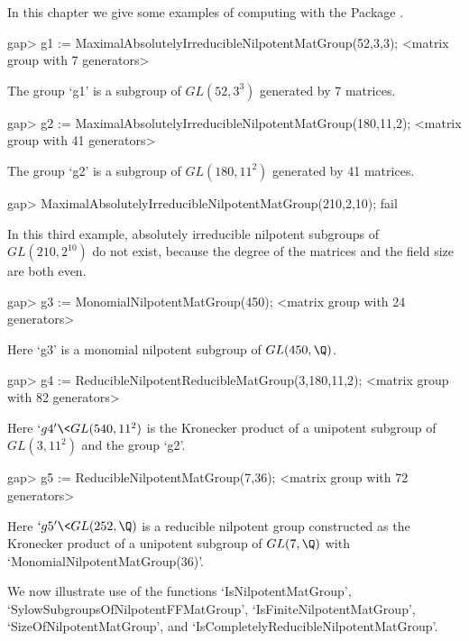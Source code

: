 

In this chapter we give some examples of computing with the Package
.


\beginexample
gap> g1 := MaximalAbsolutelyIrreducibleNilpotentMatGroup(52,3,3);
<matrix group with 7 generators>
\endexample

The group `g1' is a subgroup of $GL(52,3^3)$ generated by 7 matrices.

\beginexample
gap> g2 := MaximalAbsolutelyIrreducibleNilpotentMatGroup(180,11,2);
<matrix group with 41 generators>
\endexample

The group `g2' is a subgroup of $GL(180,11^2)$ generated by 41 matrices.

\beginexample
gap> MaximalAbsolutelyIrreducibleNilpotentMatGroup(210,2,10);
fail
\endexample

In this third example, absolutely irreducible nilpotent subgroups of
$GL(210,2^{10})$ do not exist, because the degree of the matrices
and the field size are both even.

\beginexample
gap> g3 := MonomialNilpotentMatGroup(450);
<matrix group with 24 generators>
\endexample

Here `g3' is a monomial nilpotent subgroup of $GL(450,\Q)$.

\beginexample
gap> g4 := ReducibleNilpotentReducibleMatGroup(3,180,11,2);
<matrix group with 82 generators>
\endexample

Here $`g4' \< GL(540,11^2)$ is the Kronecker product of a
unipotent subgroup of $GL(3,11^2)$ and the group `g2'.

\beginexample
gap> g5 := ReducibleNilpotentMatGroup(7,36);
<matrix group with 72 generators>
\endexample

Here $`g5' \< GL(252, \Q)$ is a reducible nilpotent group constructed
as the Kronecker product of a unipotent subgroup of $GL(7,\Q)$ with
`MonomialNilpotentMatGroup(36)'.


We now illustrate use of the functions
`IsNilpotentMatGroup',
`SylowSubgroupsOfNilpotentFFMatGroup',
`IsFiniteNilpotentMatGroup',
`SizeOfNilpotentMatGroup', and
`IsCompletelyReducibleNilpotentMatGroup'.

